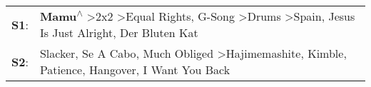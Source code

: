 \begin{supertabular}{p{0.03\textwidth}p{0.92\textwidth}}
 \textbf{S1}:  &  \textbf{Mamu\textsuperscript{$\wedge$}} \textgreater \enspace 2x2\textsuperscript{} \textgreater \enspace Equal Rights\textsuperscript{}, \enspace G-Song\textsuperscript{} \textgreater \enspace Drums\textsuperscript{} \textgreater \enspace Spain\textsuperscript{}, \enspace Jesus Is Just Alright\textsuperscript{}, \enspace Der Bluten Kat\textsuperscript{}  \enspace  \\
 \textbf{S2}:  &                                               Slacker\textsuperscript{}, \enspace Se A Cabo\textsuperscript{}, \enspace Much Obliged\textsuperscript{} \textgreater \enspace Hajimemashite\textsuperscript{}, \enspace Kimble\textsuperscript{}, \enspace Patience\textsuperscript{}, \enspace Hangover\textsuperscript{}, \enspace I Want You Back\textsuperscript{}  \enspace  \\
\end{supertabular}
